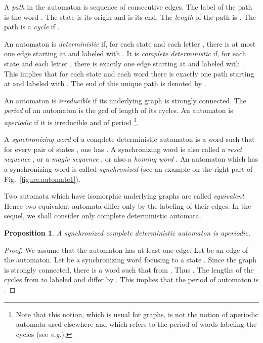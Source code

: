 \documentclass[11pt,a4paper]{article}
\newtheorem{proposition}[theorem]{Proposition}
\newcommand{\eg}{{\itshape e.g.}\xspace }
\begin{document}
A \emph{path} in the automaton is sequence of consecutive edges. The
label of the path  is the word . The state  is its origin and  is its end.
The \emph{length} of the path is . The path is a \emph{cycle} if .

An automaton is \emph{deterministic} if, for each state  and each
letter , there is at most one edge starting at  and labeled with
.  It is \emph{complete deterministic} if, for each state  and
each letter , there is exactly one edge starting at  and
labeled with .  This implies that for each state  and each word
 there is exactly one path starting at  and labeled with .
The end of this unique path is denoted by .

An automaton is \emph{irreducible} if its underlying graph is strongly
connected. The \emph{period} of an automaton is the gcd of length of
its cycles. An automaton is \emph{aperiodic} if it is
irreducible and of period \footnote{Note that this notion, which is
  usual for graphs, is not the notion of aperiodic automata used
  elsewhere and which refers to the period of words labeling the
  cycles (see \eg \cite{Eilenberg76B}).}.

A \emph{synchronizing word} of a complete deterministic automaton
 is a word  such that for every pair of states
, one has .  A synchronizing word is
also called a \emph{reset sequence} \cite{Eppstein1990}, or a
\emph{magic sequence} \cite{BoyleMass2000,BoyleMass2004}, or also a
\emph{homing word} \cite{PomeranzReddy1994}. An automaton which has a
synchronizing word is called \emph{synchronized} (see an example on
the right part of Fig.~\ref{figure.automate1}).

Two automata which have isomorphic underlying graphs are called
\emph{equivalent}. Hence two equivalent automata differ only by the
labeling of their edges. In the sequel, we shall consider only complete
deterministic automata.

\begin{proposition} A synchronized complete deterministic automaton is aperiodic.
\end{proposition}
\begin{proof}
We assume that the automaton has at least one edge.  Let  be
an edge of the automaton.  Let  be a synchronizing word focusing to
a state .  Since the graph is strongly connected, there is a word
 such that from . Thus .  The lengths of the cycles from  to  labeled  and
 differ by .  This implies that the period of automaton is .
\end{proof}
\end{document}
